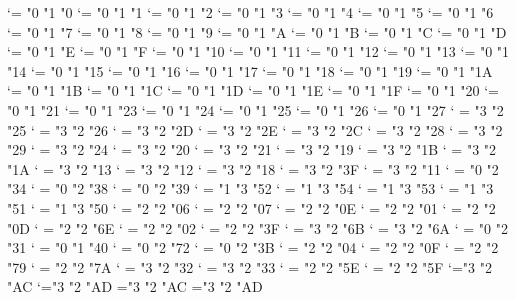 \XeTeXmathcode`\Γ = "0 "1 "0
\XeTeXmathcode`\Δ = "0 "1 "1
\XeTeXmathcode`\Θ = "0 "1 "2
\XeTeXmathcode`\Λ = "0 "1 "3
\XeTeXmathcode`\Ξ = "0 "1 "4
\XeTeXmathcode`\Π = "0 "1 "5
\XeTeXmathcode`\Σ = "0 "1 "6
\XeTeXmathcode`\Τ = "0 "1 "7
\XeTeXmathcode`\Φ = "0 "1 "8
\XeTeXmathcode`\Ψ = "0 "1 "9
\XeTeXmathcode`\Ω = "0 "1 "A
\XeTeXmathcode`\α = "0 "1 "B
\XeTeXmathcode`\β = "0 "1 "C
\XeTeXmathcode`\γ = "0 "1 "D
\XeTeXmathcode`\δ = "0 "1 "E
\XeTeXmathcode`\ε = "0 "1 "F
%
\XeTeXmathcode`\ζ = "0 "1 "10
\XeTeXmathcode`\η = "0 "1 "11
\XeTeXmathcode`\θ = "0 "1 "12
\XeTeXmathcode`\ι = "0 "1 "13
\XeTeXmathcode`\κ = "0 "1 "14
\XeTeXmathcode`\λ = "0 "1 "15
\XeTeXmathcode`\μ = "0 "1 "16
\XeTeXmathcode`\ν = "0 "1 "17
\XeTeXmathcode`\ξ = "0 "1 "18
\XeTeXmathcode`\π = "0 "1 "19
\XeTeXmathcode`\ρ = "0 "1 "1A
\XeTeXmathcode`\σ = "0 "1 "1B
\XeTeXmathcode`\τ = "0 "1 "1C
\XeTeXmathcode`\υ = "0 "1 "1D
\XeTeXmathcode`\ϕ = "0 "1 "1E
\XeTeXmathcode`\χ = "0 "1 "1F
%
\XeTeXmathcode`\ψ = "0 "1 "20
\XeTeXmathcode`\ω = "0 "1 "21
\XeTeXmathcode`\ϑ = "0 "1 "23
\XeTeXmathcode`\ϖ = "0 "1 "24
\XeTeXmathcode`\ϱ = "0 "1 "25
\XeTeXmathcode`\ς = "0 "1 "26
\XeTeXmathcode`\φ = "0 "1 "27
\XeTeXmathcode`\↗ = "3 "2 "25
\XeTeXmathcode`\↘ = "3 "2 "26
\XeTeXmathcode`\↖ = "3 "2 "2D
\XeTeXmathcode`\↙ = "3 "2 "2E
\XeTeXmathcode`\⇔ = "3 "2 "2C
\XeTeXmathcode`\⇐ = "3 "2 "28
\XeTeXmathcode`\⇒ = "3 "2 "29
\XeTeXmathcode`\↔ = "3 "2 "24
\XeTeXmathcode`\← = "3 "2 "20
\XeTeXmathcode`\→ = "3 "2 "21
\XeTeXmathcode`\≈ = "3 "2 "19
\XeTeXmathcode`\⊃ = "3 "2 "1B
\XeTeXmathcode`\⊂ = "3 "2 "1A
\XeTeXmathcode`\⊇ = "3 "2 "13
\XeTeXmathcode`\⊆ = "3 "2 "12
\XeTeXmathcode`\∼ = "3 "2 "18
\XeTeXmathcode`\⊥ = "3 "2 "3F
\XeTeXmathcode`\≡ = "3 "2 "11
\XeTeXmathcode`\△ = "0 "2 "34
\XeTeXmathcode`\∀ = "0 "2 "38
\XeTeXmathcode`\∃ = "0 "2 "39
\XeTeXmathcode`\∫ = "1 "3 "52
\XeTeXmathcode`\⋂ = "1 "3 "54
\XeTeXmathcode`\⋃ = "1 "3 "53
\XeTeXmathcode`\∏ = "1 "3 "51
\XeTeXmathcode`\∑ = "1 "3 "50
\XeTeXmathcode`\± = "2 "2 "06
\XeTeXmathcode`\∓ = "2 "2 "07
\XeTeXmathcode`\∘ = "2 "2 "0E
\XeTeXmathcode`\⋅ = "2 "2 "01
\XeTeXmathcode`\◯ = "2 "2 "0D
\XeTeXmathcode`\∖ = "2 "2 "6E
\XeTeXmathcode`\× = "2 "2 "02
\XeTeXmathcode`\⋆ = "2 "2 "3F
\XeTeXmathcode`\∥ = "3 "2 "6B
\XeTeXmathcode`\∣ = "3 "2 "6A
\XeTeXmathcode`\∞ = "0 "2 "31
\XeTeXmathcode`\∂ = "0 "1 "40
\XeTeXmathcode`\∇ = "0 "2 "72
\XeTeXmathcode`\∅ = "0 "2 "3B
\XeTeXmathcode`\÷ = "2 "2 "04
\XeTeXmathcode`\∙ = "2 "2 "0F
\XeTeXmathcode`\† = "2 "2 "79
\XeTeXmathcode`\‡ = "2 "2 "7A
\XeTeXmathcode`\∈ = "3 "2 "32
\XeTeXmathcode`\∋ = "3 "2 "33
\XeTeXmathcode`\∧ = "2 "2 "5E
\XeTeXmathcode`\∨ = "2 "2 "5F
\XeTeXmathcode`\⩽="3 "2 "AC
\XeTeXmathcode`\⩾="3 "2 "AD
\XeTeXmathchardef\xleq="3 "2 "AC \let\xle=\xleq
\XeTeXmathchardef\xgeq="3 "2 "AD \let\xge=\xgeq
%
\endinput

